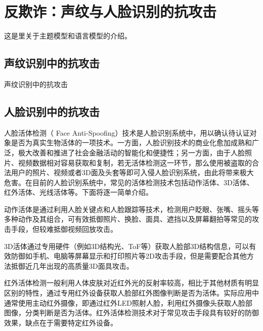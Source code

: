 %
%
%
\chapter{反欺诈：声纹与人脸识别的抗攻击}
\label{basic} %


这是里关于主题模型和语言模型的介绍。

\section{声纹识别中的抗攻击}

声纹识别中的抗攻击

\section{人脸识别中的抗攻击}

人脸活体检测（ Face Anti-Spoofing）技术是人脸识别系统中，用以确认待认证对象是否为真实生物活体的一项技术。一方面，人脸识别技术的商业化愈加成熟和广泛，极大改善和推进了社会金融活动的智能化和便捷性；另一方面，由于人脸照片、视频数据相对容易获取和复制，若无活体检测这一环节，那么使用被盗取的合法用户的照片、视频或者3D面及头套等即可入侵人脸识别系统，由此将带来极大危害\cite{chingovska2012effectiveness}。在目前的人脸识别系统中，常见的活体检测技术包括动作活体、3D活体、红外活体、光线活体等。下面将逐一简单介绍。

动作活体是通过利用人脸关键点和人脸跟踪等技术，检测用户眨眼、张嘴、摇头等多种动作及其组合，可有效抵御照片、换脸、面具、遮挡以及屏幕翻拍等常见的攻击手段，但较难抵御视频回放攻击。

3D活体通过专用硬件（例如3D结构光、ToF等）获取人脸部3D结构信息，可以有效防御如手机、电脑等屏幕显示和打印照片等2D攻击手段，但是需要配合其他方法抵御近几年出现的高质量3D面具攻击\cite{zhang2019dataset}。

红外活体检测一般利用人体皮肤对近红外光的反射率较高，相比于其他材质有明显区别的特性，通过专用红外设备获取人脸部红外图像判断是否为活体。实际应用中通常使用主动红外摄像，即通过红外LED照射人脸，利用红外摄像头获取人脸部图像，分类判断是否为活体。红外活体检测技术对于常见攻击手段具有较好的防御效果，缺点在于需要特定红外设备\cite{zhang2019dataset,yi2014face}。

